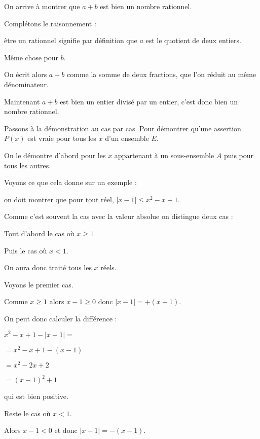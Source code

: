 On arrive à montrer que $a+b$ est bien un nombre rationnel.


\change

Complétons le raisonnement :

être un rationnel signifie par définition que $a$ est le quotient de deux entiers.

Même chose pour $b$.

On écrit alors $a+b$ comme la somme de deux fractions,
que l'on réduit au même dénominateur.

Maintenant $a+b$ est bien un entier
divisé par un entier,
c'est donc bien un nombre rationnel.


\diapo

Passons à la démonstration au cas par cas.
Pour démontrer qu'une assertion $P(x)$ est vraie
pour tous les $x$ d'un ensemble $E$.

On le démontre d'abord pour les $x$ appartenant à un sous-ensemble 
$A$ puis pour tous les autres.

\change

Voyons ce que cela donne sur un exemple :

on doit montrer que pour tout réel, $|x-1| \le x^2-x+1$.


\change

Comme c'est souvent la cas avec la valeur absolue on distingue deux cas :

\change

Tout d'abord le cas où $x \ge 1$

\change 

Puis le cas où $x<1$. 

On aura donc traité tous les $x$ réels.

\change

Voyons le premier cas.

Comme $x\ge 1$ alors $x-1 \ge 0$ donc $|x-1|=+(x-1)$.

On peut donc calculer la différence :

 $ x^2-x+1 - |x-1|=$
 
$=   x^2-x+1 - (x-1)$
   
   $=x^2 -2x + 2$
   
   $=(x-1)^2 + 1$


qui est bien positive.

\change

Reste le cas où $x < 1$.

Alors $x-1 < 0$ et donc $|x-1|=-(x-1)$.

